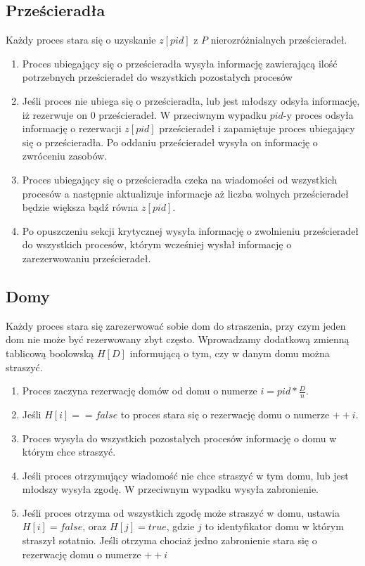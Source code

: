 \documentclass{article}
\begin{document}
\subsection{Prześcieradła}
Każdy proces stara się o uzyskanie $z[pid]$ z $P$ nierozróżnialnych prześcieradeł.
\begin{enumerate}
    \item Proces ubiegający się o prześcieradła wysyła informację zawierającą ilość potrzebnych prześcieradeł do wszystkich pozostałych procesów
    \item Jeśli proces nie ubiega się o prześcieradła, lub jest młodszy odsyła informację, iż rezerwuje on $0$ prześcieradeł. W przeciwnym wypadku $pid$-y proces odsyła informację o rezerwacji $z[pid]$ prześcieradeł i zapamiętuje proces ubiegający się o prześcieradła. Po oddaniu prześcieradeł wysyła on informację o zwróceniu zasobów.
    \item Proces ubiegający się o prześcieradła czeka na wiadomości od wszystkich procesów a następnie aktualizuje informacje aż liczba wolnych prześcieradeł będzie większa bądź równa $z[pid]$.
    \item Po opuszczeniu sekcji krytycznej wysyła informację o zwolnieniu prześcieradeł do wszystkich procesów, którym wcześniej wysłał informację o zarezerwowaniu prześcieradeł.
\end{enumerate}
\subsection{Domy}
Każdy proces stara się zarezerwować sobie dom do straszenia, przy czym jeden dom nie może być rezerwowany zbyt często. Wprowadzamy dodatkową zmienną tablicową boolowską $H[D]$ informującą o tym, czy w danym domu można straszyć.
\begin{enumerate}
    \item Proces zaczyna rezerwację domów od domu o numerze $ i = pid * \frac{D}{n}$.
    \item Jeśli $H[i] == false$ to proces stara się o rezerwację domu o numerze $++i$.
    \item Proces wysyła do wszystkich pozostałych procesów informację o domu w którym chce straszyć.
    \item Jeśli proces otrzymujący wiadomość nie chce straszyć w tym domu, lub jest młodszy wysyła zgodę. W przeciwnym wypadku wysyła zabronienie.
    \item Jeśli proces otrzyma od wszystkich zgodę może straszyć w domu, ustawia $H[i] = false$, oraz $H[j] = true$, gdzie $j$ to identyfikator domu w którym straszył sotatnio. Jeśli otrzyma chociaż jedno zabronienie stara się o rezerwację domu o numerze $++i$
\end{enumerate}




\end{document}
